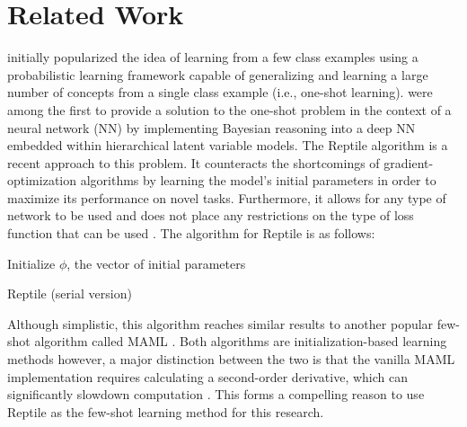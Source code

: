 \documentclass[a4paper]{book}
\begin{document}
\chapter{Related Work}

\textcite{lake_human-level_2015} initially popularized the idea of learning from a few class examples using a probabilistic learning framework capable of generalizing and learning a large number of concepts from a single class example (i.e., one-shot learning). \textcite{rezende_one-shot_2016} were among the first to provide a solution to the one-shot problem in the context of a neural network (NN) by implementing Bayesian reasoning into a deep NN embedded within hierarchical latent variable models. The Reptile algorithm \parencite{nichol_first-order_2018} is a recent approach to this problem. It counteracts the shortcomings of gradient-optimization algorithms by learning the model's initial parameters in order to maximize its performance on novel tasks. Furthermore, it allows for any type of network to be used and does not place any restrictions on the type of loss function that can be used \parencite{nichol_first-order_2018}. The algorithm for Reptile is as follows:

\IncMargin{1em}
\begin{algorithm}
Initialize $\phi$, the vector of initial parameters


\caption{Reptile (serial version)}
\label{alg:reptile}
\end{algorithm}
\DecMargin{1em}

Although simplistic, this algorithm reaches similar results to another popular few-shot algorithm called MAML \parencite{finn_model-agnostic_2017}. Both algorithms are initialization-based learning methods however, a major distinction between the two is that the vanilla MAML implementation requires calculating a second-order derivative, which can significantly slowdown computation \parencite{nichol_first-order_2018}. This forms a compelling reason to use Reptile as the few-shot learning method for this research.
\end{document}
